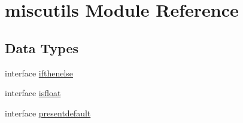 \hypertarget{namespacemiscutils}{}\section{miscutils Module Reference}
\label{namespacemiscutils}
\subsection*{Data Types}
\begin{DoxyCompactItemize}
\item 
interface \mbox{\hyperlink{interfacemiscutils_1_1ifthenelse}{ifthenelse}}
\item 
interface \mbox{\hyperlink{interfacemiscutils_1_1isfloat}{isfloat}}
\item 
interface \mbox{\hyperlink{interfacemiscutils_1_1presentdefault}{presentdefault}}
\end{DoxyCompactItemize}
